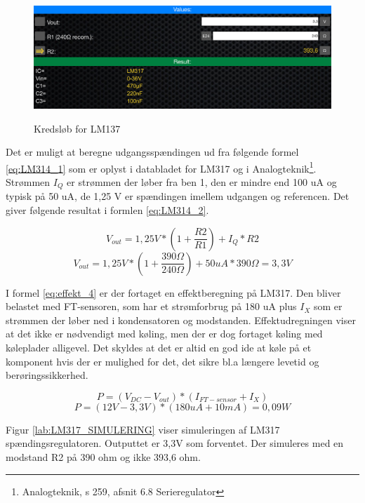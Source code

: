 \begin{figure}[H] \centering
{\includegraphics[width=\textwidth]{filer/design/Billeder/LM317_calc}}
\caption{Kredsløb for LM137}
\label{lab:LM317_calc}
\raggedright
\end{figure}

Det er muligt at beregne udgangsspændingen ud fra følgende formel \ref{eq:LM314_1} som er oplyst i databladet for LM317 og i Analogteknik\footnote{Analogteknik, s 259, afsnit 6.8 Serieregulator}. Strømmen $I_Q$ er strømmen der løber fra ben 1, den er mindre end 100 uA og typisk på 50 uA, de 1,25 V er spændingen imellem udgangen og referencen. Det giver følgende resultat i formlen \ref{eq:LM314_2}. 

\begin{equation} 
V_{out} = 1,25 V*(1+\frac{R2}{R1})+I_Q*R2
\label{eq:LM314_1}
\end{equation}
\begin{equation} 
V_{out} = 1,25 V*(1+\frac{390\Omega}{240\Omega})+50uA*390\Omega = 3,3 V
\label{eq:LM314_2}
\end{equation}


I formel \ref{eq:effekt_4} er der fortaget en effektberegning på LM317. Den bliver belastet med FT-sensoren, som har et strømforbrug på 180 uA plus $I_X$ som er strømmen der løber ned i kondensatoren og modstanden. Effektudregningen viser at det ikke er nødvendigt med køling, men der er dog  fortaget køling med køleplader alligevel. Det skyldes at det er altid en god ide at køle på et komponent hvis der er mulighed for det, det sikre bl.a længere levetid og berøringssikkerhed. 
 
\begin{equation} 
P = (V_{DC}-V_{out})*(I_{FT-sensor}+I_X) 
\label{eq:effekt_3}
\end{equation}
\begin{equation} 
P = (12V - 3,3V)*(180 uA +10 mA)= 0,09 W 
\label{eq:effekt_4}
\end{equation}


Figur \ref{lab:LM317_SIMULERING} viser simuleringen af LM317 spændingsregulatoren. Outputtet er 3,3V som forventet. Der simuleres med en modstand R2 på 390 ohm og ikke 393,6 ohm.

